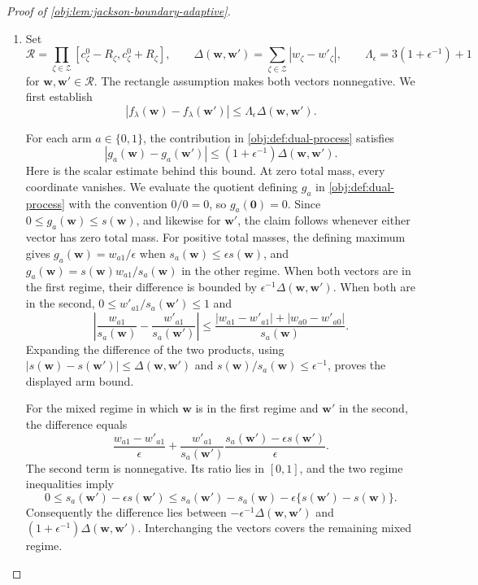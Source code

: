 \documentclass[11pt]{article}
\begin{document}
\begin{proof}[Proof of \cref{obj:lem:jackson-boundary-adaptive}]
\begin{enumerate}
\item Set
\[
\mathcal R=\prod_{\zeta\in\mathcal Z}
[c^0_\zeta-R_\zeta,c^0_\zeta+R_\zeta],
\qquad
\Delta(\mathbf w,\mathbf w')
=\sum_{\zeta\in\mathcal Z}|w_\zeta-w'_\zeta|,
\qquad
\Lambda_\epsilon=3(1+\epsilon^{-1})+1
\]
for \(\mathbf w,\mathbf w'\in\mathcal R\). The rectangle assumption makes both vectors nonnegative. We first establish
\[
|f_\lambda(\mathbf w)-f_\lambda(\mathbf w')|
\leq\Lambda_\epsilon\Delta(\mathbf w,\mathbf w').
\]

For each arm \(a\in\{0,1\}\), the contribution in \cref{obj:def:dual-process} satisfies
\[
|g_a(\mathbf w)-g_a(\mathbf w')|
\leq(1+\epsilon^{-1})\Delta(\mathbf w,\mathbf w').
\]
Here is the scalar estimate behind this bound. At zero total mass, every coordinate vanishes. We evaluate the quotient defining \(g_a\) in \cref{obj:def:dual-process} with the convention \(0/0=0\), so \(g_a(\mathbf 0)=0\). Since \(0\leq g_a(\mathbf w)\leq s(\mathbf w)\), and likewise for \(\mathbf w'\), the claim follows whenever either vector has zero total mass. For positive total masses, the defining maximum gives \(g_a(\mathbf w)=w_{a1}/\epsilon\) when \(s_a(\mathbf w)\leq\epsilon s(\mathbf w)\), and \(g_a(\mathbf w)=s(\mathbf w)w_{a1}/s_a(\mathbf w)\) in the other regime. When both vectors are in the first regime, their difference is bounded by \(\epsilon^{-1}\Delta(\mathbf w,\mathbf w')\). When both are in the second, \(0\leq w'_{a1}/s_a(\mathbf w')\leq1\) and
\[
\left|
\frac{w_{a1}}{s_a(\mathbf w)}
-\frac{w'_{a1}}{s_a(\mathbf w')}
\right|
\leq
\frac{|w_{a1}-w'_{a1}|+|w_{a0}-w'_{a0}|}
{s_a(\mathbf w)}.
\]
Expanding the difference of the two products, using
\(|s(\mathbf w)-s(\mathbf w')|\leq\Delta(\mathbf w,\mathbf w')\) and
\(s(\mathbf w)/s_a(\mathbf w)\leq\epsilon^{-1}\), proves the displayed arm bound.

For the mixed regime in which \(\mathbf w\) is in the first regime and \(\mathbf w'\) in the second, the difference equals
\[
\frac{w_{a1}-w'_{a1}}{\epsilon}
+
\frac{w'_{a1}}{s_a(\mathbf w')}
\frac{s_a(\mathbf w')-\epsilon s(\mathbf w')}{\epsilon}.
\]
The second term is nonnegative. Its ratio lies in \([0,1]\), and the two regime inequalities imply
\[
0\leq s_a(\mathbf w')-\epsilon s(\mathbf w')
\leq s_a(\mathbf w')-s_a(\mathbf w)
       -\epsilon\{s(\mathbf w')-s(\mathbf w)\}.
\]
Consequently the difference lies between
\(-\epsilon^{-1}\Delta(\mathbf w,\mathbf w')\) and
\((1+\epsilon^{-1})\Delta(\mathbf w,\mathbf w')\).
Interchanging the vectors covers the remaining mixed regime.


\end{enumerate}
\end{proof}
\end{document}
